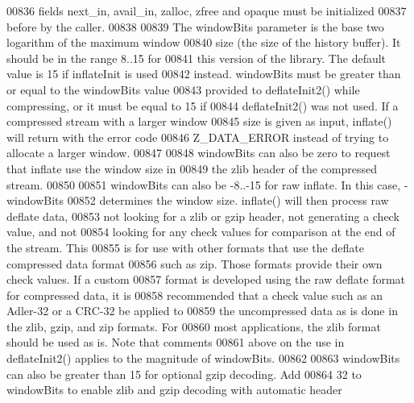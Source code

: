 \begin{DoxyCode}
00836 \textcolor{comment}{   fields next\_in, avail\_in, zalloc, zfree and opaque must be initialized}
00837 \textcolor{comment}{   before by the caller.}
00838 \textcolor{comment}{}
00839 \textcolor{comment}{     The windowBits parameter is the base two logarithm of the maximum window}
00840 \textcolor{comment}{   size (the size of the history buffer).  It should be in the range 8..15 for}
00841 \textcolor{comment}{   this version of the library.  The default value is 15 if inflateInit is used}
00842 \textcolor{comment}{   instead.  windowBits must be greater than or equal to the windowBits value}
00843 \textcolor{comment}{   provided to deflateInit2() while compressing, or it must be equal to 15 if}
00844 \textcolor{comment}{   deflateInit2() was not used.  If a compressed stream with a larger window}
00845 \textcolor{comment}{   size is given as input, inflate() will return with the error code}
00846 \textcolor{comment}{   Z\_DATA\_ERROR instead of trying to allocate a larger window.}
00847 \textcolor{comment}{}
00848 \textcolor{comment}{     windowBits can also be zero to request that inflate use the window size in}
00849 \textcolor{comment}{   the zlib header of the compressed stream.}
00850 \textcolor{comment}{}
00851 \textcolor{comment}{     windowBits can also be -8..-15 for raw inflate.  In this case, -windowBits}
00852 \textcolor{comment}{   determines the window size.  inflate() will then process raw deflate data,}
00853 \textcolor{comment}{   not looking for a zlib or gzip header, not generating a check value, and not}
00854 \textcolor{comment}{   looking for any check values for comparison at the end of the stream.  This}
00855 \textcolor{comment}{   is for use with other formats that use the deflate compressed data format}
00856 \textcolor{comment}{   such as zip.  Those formats provide their own check values.  If a custom}
00857 \textcolor{comment}{   format is developed using the raw deflate format for compressed data, it is}
00858 \textcolor{comment}{   recommended that a check value such as an Adler-32 or a CRC-32 be applied to}
00859 \textcolor{comment}{   the uncompressed data as is done in the zlib, gzip, and zip formats.  For}
00860 \textcolor{comment}{   most applications, the zlib format should be used as is.  Note that comments}
00861 \textcolor{comment}{   above on the use in deflateInit2() applies to the magnitude of windowBits.}
00862 \textcolor{comment}{}
00863 \textcolor{comment}{     windowBits can also be greater than 15 for optional gzip decoding.  Add}
00864 \textcolor{comment}{   32 to windowBits to enable zlib and gzip decoding with automatic header}

\end{DoxyCode}
